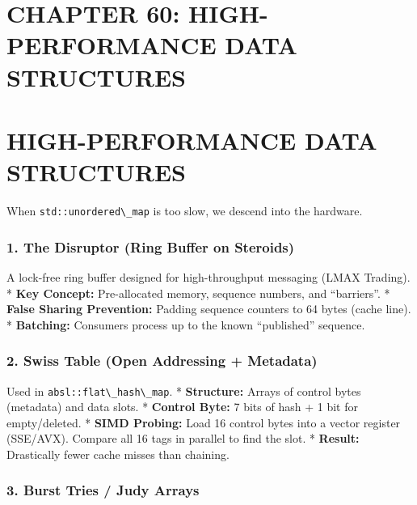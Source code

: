 \hypertarget{chapter-60-high-performance-data-structures}{%
\section{CHAPTER 60: HIGH-PERFORMANCE DATA
STRUCTURES}\label{chapter-60-high-performance-data-structures}}

\hypertarget{high-performance-data-structures}{%
\section{HIGH-PERFORMANCE DATA
STRUCTURES}\label{high-performance-data-structures}}

When \passthrough{\lstinline!std::unordered\_map!} is too slow, we
descend into the hardware.

\hypertarget{the-disruptor-ring-buffer-on-steroids}{%
\subsubsection{1. The Disruptor (Ring Buffer on
Steroids)}\label{the-disruptor-ring-buffer-on-steroids}}

A lock-free ring buffer designed for high-throughput messaging (LMAX
Trading). * \textbf{Key Concept:} Pre-allocated memory, sequence
numbers, and ``barriers''. * \textbf{False Sharing Prevention:} Padding
sequence counters to 64 bytes (cache line). * \textbf{Batching:}
Consumers process up to the known ``published'' sequence.

\hypertarget{swiss-table-open-addressing-metadata}{%
\subsubsection{2. Swiss Table (Open Addressing +
Metadata)}\label{swiss-table-open-addressing-metadata}}

Used in \passthrough{\lstinline!absl::flat\_hash\_map!}. *
\textbf{Structure:} Arrays of control bytes (metadata) and data slots. *
\textbf{Control Byte:} 7 bits of hash + 1 bit for empty/deleted. *
\textbf{SIMD Probing:} Load 16 control bytes into a vector register
(SSE/AVX). Compare all 16 tags in parallel to find the slot. *
\textbf{Result:} Drastically fewer cache misses than chaining.

\hypertarget{burst-tries-judy-arrays}{%
\subsubsection{3. Burst Tries / Judy
Arrays}\label{burst-tries-judy-arrays}}

